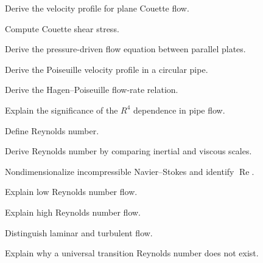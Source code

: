 \begin{exercise}[2]
Derive the velocity profile for plane Couette flow.
\end{exercise}

\begin{exercise}[2]
Compute Couette shear stress.
\end{exercise}

\begin{exercise}[3]
Derive the pressure-driven flow equation between parallel plates.
\end{exercise}

\begin{exercise}[3]
Derive the Poiseuille velocity profile in a circular pipe.
\end{exercise}

\begin{exercise}[3]
Derive the Hagen--Poiseuille flow-rate relation.
\end{exercise}

\begin{exercise}[3]
Explain the significance of the \(R^4\) dependence in pipe flow.
\end{exercise}

\begin{exercise}[2]
Define Reynolds number.
\end{exercise}

\begin{exercise}[3]
Derive Reynolds number by comparing inertial and viscous scales.
\end{exercise}

\begin{exercise}[3]
Nondimensionalize incompressible Navier--Stokes and identify
\(\operatorname{Re}\).
\end{exercise}

\begin{exercise}[2]
Explain low Reynolds number flow.
\end{exercise}

\begin{exercise}[2]
Explain high Reynolds number flow.
\end{exercise}

\begin{exercise}[2]
Distinguish laminar and turbulent flow.
\end{exercise}

\begin{exercise}[3]
Explain why a universal transition Reynolds number does not exist.
\end{exercise}

